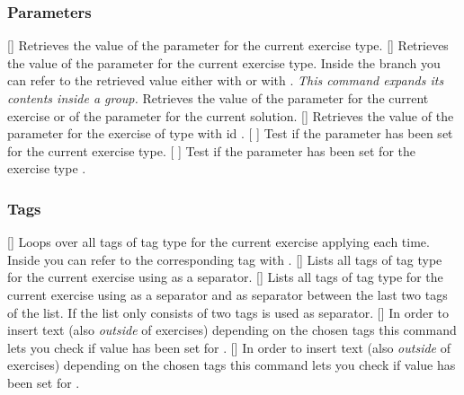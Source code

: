 \documentclass{xsim-manual}
\begin{document}
\subsubsection{Parameters}
\begin{commands}
  \expandable{}[]
    Retrieves the value of the parameter  for the current
    exercise type.
  []
    Retrieves the value of the parameter 
    for the current exercise type. Inside the  branch you can refer
    to the retrieved value either with  or with .
    \emph{This command expands its contents inside a group.}
  \expandable{}
    Retrieves the value of the parameter  for the
    current exercise or of the parameter  for the
    current solution.
  \expandable{}[]
    Retrieves the value of the parameter  for the exercise of type
     with id .
  \expandable{}[%
    ]
    Test if the parameter  has been set for
    the current exercise type.
  \expandable{}[%
    ]
    Test if the parameter  has been set for
    the exercise type .
\end{commands}

\subsubsection{Tags}
\begin{commands}
  []
    Loops over all tags of tag type  for the current exercise
    applying  each time.  Inside  you can refer to the
    corresponding tag with .
  []
    Lists all tags of tag type  for the current exercise using
     as a separator.
  []
    Lists all tags of tag type  for the current exercise using
     as a separator and  as separator
    between the last two tags of the list.  If the list only consists of two
    tags  is used as separator.
  []
    In order to insert text (also \emph{outside} of
    exercises) depending on the chosen tags this command lets you check if
    value  has been set for .
  []
    In order to insert text (also \emph{outside} of
    exercises) depending on the chosen tags this command lets you check if
    value  has been set for .
\end{commands}
\end{document}
